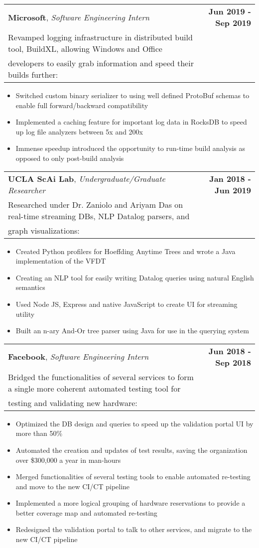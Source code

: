 \documentclass[letterpaper,10.8pt]{article}
\makeatletter
\newcommand{\resumeItemOne}[1]{
  \item[$\circ$]\small{{#1 \vspace{-2pt}}
  }
}
\newcommand{\resumeSubheading}[4]{
  \vspace{-2pt}\item[$ $]
    \begin{tabular*}{0.97\textwidth}{l@{\extracolsep{\fill}}r}
      \textbf{#1}, \textit{\small #2} & \textbf{\small #3} \\
      \small #4
    \end{tabular*}
  \vspace{-7pt}
}
\newcommand{\resumeItemListStart}{\begin{itemize}}
\newcommand{\resumeItemListEnd}{\end{itemize}\vspace{-5pt}}
\makeatother
\begin{document}
    \resumeSubheading
    {Microsoft}{Software Engineering Intern}{Jun 2019 - Sep 2019}{Revamped logging infrastructure in distributed build tool, BuildXL, allowing Windows and Office \\developers to easily grab information and speed their builds further:}
    \resumeItemListStart
        \resumeItemOne{Switched custom binary serializer to using well defined ProtoBuf schemas to enable full forward/backward compatibility}
        \resumeItemOne{Implemented a caching feature for important log data in RocksDB to speed up log file analyzers between 5x and 200x}
        \resumeItemOne{Immense speedup introduced the opportunity to run-time build analysis as opposed to only post-build analysis}
    \resumeItemListEnd
    
    \resumeSubheading
    {UCLA ScAi Lab}{Undergraduate/Graduate Researcher}{Jan 2018 - Jun 2019}{Researched under Dr. Zaniolo and Ariyam Das on real-time streaming DBs, NLP Datalog parsers, and\\ graph visualizations:}
    \resumeItemListStart
        \resumeItemOne{Created Python profilers for Hoeffding Anytime Trees and wrote a Java implementation of the VFDT}
        \resumeItemOne{Creating an NLP tool for easily writing Datalog queries using natural English semantics}
        \resumeItemOne{Used Node JS, Express and native JavaScript to create UI for streaming utility}
        \resumeItemOne{Built an n-ary And-Or tree parser using Java for use in the querying system}
    \resumeItemListEnd

    \resumeSubheading
    {Facebook}{Software Engineering Intern}{Jun 2018 - Sep 2018}{Bridged the functionalities of several services to form a single more coherent automated testing tool for\\ testing and validating new hardware: }
    \resumeItemListStart
        \resumeItemOne{Optimized the DB design and queries to speed up the validation portal UI by more than 50\%}
        \resumeItemOne{Automated the creation and updates of test results, saving the organization over \$300,000 a year in man-hours}
        \resumeItemOne{Merged functionalities of several testing tools to enable automated re-testing and move to the new CI/CT pipeline}
        \resumeItemOne{Implemented a more logical grouping of hardware reservations to provide a better coverage map and
        automated re-testing}
        \resumeItemOne{Redesigned the validation portal to talk to other services, and migrate to the new CI/CT pipeline}
    \resumeItemListEnd
  
\end{document}
